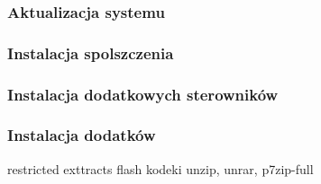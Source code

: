 \subsubsection{Aktualizacja systemu}
\subsubsection{Instalacja spolszczenia}
\subsubsection{Instalacja dodatkowych sterowników}
\subsubsection{Instalacja dodatków}
restricted exttracts
flash
kodeki
unzip, unrar, p7zip-full